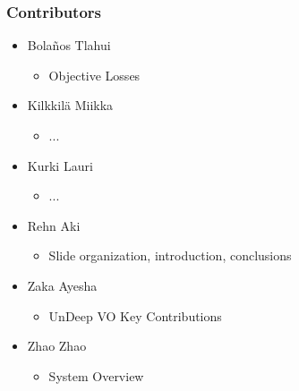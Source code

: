 \begin{frame}
    \frametitle{Contributors}
    \begin{itemize}
        \item Bola\~nos Tlahui
            \begin{itemize}
                \item Objective Losses
            \end{itemize}
        \item Kilkkilä Miikka
            \begin{itemize}
                \item ...
            \end{itemize}
        \item Kurki Lauri
            \begin{itemize}
                \item ...
            \end{itemize}
        \item Rehn Aki
            \begin{itemize}
                \item Slide organization, introduction, conclusions
            \end{itemize}
        \item Zaka Ayesha
            \begin{itemize}
                \item UnDeep VO Key Contributions
            \end{itemize}
        \item Zhao Zhao
            \begin{itemize}
                \item System Overview
            \end{itemize}
    \end{itemize}
\end{frame}
